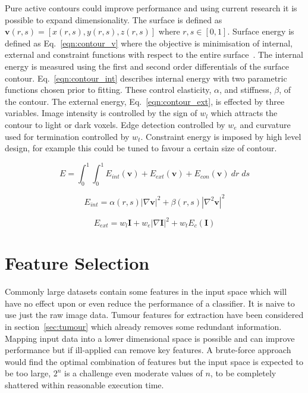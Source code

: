 \documentclass[journal]{IEEEtran}
\begin{document}
Pure active contours could improve performance and using current research it is possible to expand dimensionality.
The surface is defined as $\mathbf{v}(r,s) = [x(r,s),y(r,s),z(r,s)]$ where $r,s \in [0,1]$.
Surface energy is defined as Eq.~\eqref{eqn:contour_v} where the objective is minimisation of internal, external and constraint functions with respect to the entire surface~\cite{nixon02feature,skalski13automatic}. 
The internal energy is measured using the first and second order differentials of the surface contour.
Eq.~\eqref{eqn:contour_int} describes internal energy with two parametric functions chosen prior to fitting.
These control elasticity, $\alpha$, and stiffness, $\beta$, of the contour.
The external energy, Eq.~\ref{eqn:contour_ext}, is effected by three variables.
Image intensity is controlled by the sign of $w_l$ which attracts the contour to light or dark voxels.
Edge detection controlled by $w_e$ and curvature used for termination controlled by $w_t$.
Constraint energy is imposed by high level design, for example this could be tuned to favour a certain size of contour.


\begin{equation}
	E = \int_0^{1}\int_0^{1} E_{int}(\mathbf{v}) + E_{ext}(\mathbf{v}) + E_{con}(\mathbf{v})\:dr\;ds
	\label{eqn:contour_v}
\end{equation}

\begin{equation}
	 E_{int}= \alpha(r,s)\left|\nabla \mathbf{v}\right|^2 + \beta(r,s)\left|\nabla^2 \mathbf{v}\right|^2 
	 \label{eqn:contour_int}
\end{equation}

\begin{equation}
	 E_{ext}= w_{l}\mathbf{I} + w_{e}|\nabla \mathbf{I}|^2 + w_{t}E_c(\mathbf{I})
	 \label{eqn:contour_ext}
\end{equation}















\section{Feature Selection}
\label{sec:selection}

Commonly large datasets contain some features in the input space which will have no effect upon or even reduce the performance of a classifier.
It is naive to use just the raw image data.
Tumour features for extraction have been considered in section~\ref{sec:tumour} which already removes some redundant information. 
Mapping input data into a lower dimensional space is possible and can improve performance but if ill-applied can remove key features.
A brute-force approach would find the optimal combination of features but the input space is expected to be too large, $2^n$ is a challenge even moderate values of $n$, to be completely shattered within reasonable execution time. 
\end{document}
